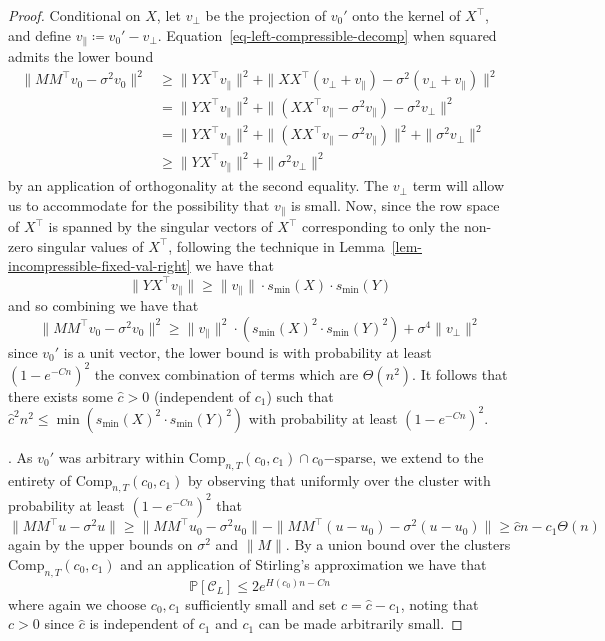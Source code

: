 \documentclass[11pt]{article}
\numberwithin{equation}{section}
\theoremstyle{remark}
\newcommand{\Comp}{\mathrm{Comp}}
\newcommand{\MinSingVal}{s_{\mathrm{min}}}
\begin{document}
\begin{proof}
    Conditional on $X$, let $v_{\perp}$ be the projection of $v_0'$ onto the kernel of $X^\top $, and define $v_{\|} \coloneqq v_0' - v_{\perp}$. Equation~\ref{eq-left-compressible-decomp} when squared admits the lower bound
    \begin{align*}
        \| MM^\top v_0 - \sigma^2 v_0\|^2 &\geq \|YX^\top v_{\|}\|^2 + \|XX^\top (v_{\perp} + v_{\|}) - \sigma^2 (v_{\perp} + v_{\|})\|^2 \\
        &= \|YX^\top v_{\|}\|^2 + \|(XX^\top v_{\|} - \sigma^2 v_{\|})  - \sigma^2 v_{\perp}\|^2 \\
        &= \|YX^\top v_{\|}\|^2 + \|(XX^\top v_{\|} - \sigma^2 v_{\|})\|^2 + \|\sigma^2 v_{\perp}\|^2 \\
        &\geq \|YX^\top v_{\|}\|^2 + \|\sigma^2 v_{\perp}\|^2
    \end{align*}
    by an application of orthogonality at the second equality. The $v_{\perp}$ term will allow us to accommodate for the possibility that $v_{\|}$ is small. Now, since the row space of $X^\top $ is spanned by the singular vectors of $X^\top $ corresponding to only the non-zero singular values of $X^\top $, following the technique in Lemma~\ref{lem-incompressible-fixed-val-right} we have that
    \begin{equation*}
        \|YX^\top v_{\|}\| \geq \|v_{\|}\| \cdot \MinSingVal(X) \cdot \MinSingVal(Y)
    \end{equation*}
    and so combining we have that
    \begin{equation*}
        \| MM^\top v_0 - \sigma^2 v_0\|^2 \geq \|v_{\|}\|^2 \cdot (\MinSingVal(X)^2 \cdot \MinSingVal(Y)^2) + \sigma^4 \|v_{\perp}\|^2
    \end{equation*}
    since $v_0'$ is a unit vector, the lower bound is with probability at least $(1 - e^{-Cn})^2$ the convex combination of terms which are $\Theta(n^2)$. It follows that there exists some $\hat{c} > 0$ (independent of $c_1$) such that $\hat{c}^2 n^2 \leq \min(\MinSingVal(X)^2 \cdot \MinSingVal(Y)^2)$ with probability at least $(1 - e^{-Cn})^2$.
    
    . As $v_0'$ was arbitrary within $\Comp_{n, T}(c_0, c_1) \cap c_0\mathrm{-sparse}$, we extend to the entirety of $\Comp_{n, T}(c_0, c_1)$ by observing that uniformly over the cluster with probability at least $(1 - e^{-Cn})^2$ that
    \begin{equation*}
        \|MM^\top  u - \sigma^2 u\| \geq \|MM^\top  u_0 - \sigma^2 u_0\| - \|MM^\top  (u - u_0) - \sigma^2 (u - u_0)\| \geq \hat{c} n - c_1 \Theta(n)
    \end{equation*}
    again by the upper bounds on $\sigma^2$ and $\|M\|$. By a union bound over the clusters $\Comp_{n, T}(c_0, c_1)$ and an application of Stirling's approximation we have that
    \begin{equation*}
         \mathbb{P}[\mathcal{C}_L] \leq 2e^{H(c_0)n - Cn}
    \end{equation*}
    where again we choose $c_0, c_1$ sufficiently small and set $c = \hat{c} - c_1$, noting that $c > 0$ since $\hat{c}$ is independent of $c_1$ and $c_1$ can be made arbitrarily small.
\end{proof}
\end{document}
